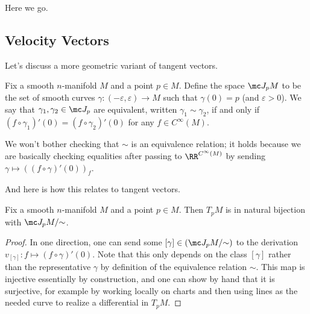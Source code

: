 \documentclass[../notes.tex]{subfiles}
\begin{document}
Here we go.

\subsection{Velocity Vectors}
Let's discuss a more geometric variant of tangent vectors.
\begin{definition}
	Fix a smooth $n$-manifold $M$ and a point $p\in M$. Define the space $\mc J_pM$ to be the set of smooth curves $\gamma\colon(-\varepsilon,\varepsilon)\to M$ such that $\gamma(0)=p$ (and $\varepsilon>0$). We say that $\gamma_1,\gamma_2\in\mc J_p$ are equivalent, written $\gamma_1\sim\gamma_2$, if and only if $(f\circ\gamma_1)'(0)=(f\circ\gamma_2)'(0)$ for any $f\in C^\infty(M)$.
\end{definition}
\begin{remark}
	We won't bother checking that $\sim$ is an equivalence relation; it holds because we are basically checking equalities after passing to $\RR^{C^\infty(M)}$ by sending $\gamma\mapsto((f\circ\gamma)'(0))_f$.
\end{remark}
And here is how this relates to tangent vectors.
\begin{lemma}
	Fix a smooth $n$-manifold $M$ and a point $p\in M$. Then $T_pM$ is in natural bijection with $\mc J_pM/{\sim}$.
\end{lemma}
\begin{proof}
	In one direction, one can send some $[\gamma]\in(\mc J_pM/{\sim})$ to the derivation $v_{[\gamma]}\colon f\mapsto(f\circ\gamma)'(0)$. Note that this only depends on the class $[\gamma]$ rather than the representative $\gamma$ by definition of the equivalence relation $\sim$. This map is injective essentially by construction, and one can show by hand that it is surjective, for example by working locally on charts and then using lines as the needed curve to realize a differential in $T_pM$.
\end{proof}
\end{document}
